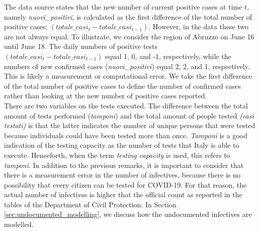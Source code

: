 \documentclass[12pt]{article}
\begin{document}
	The data source states that the new number of current positive cases at time $t$, namely \textit{nuovi\_positivi}, is calculated as the first difference of the total number of positive cases: $(totale\_casi_t - totale\_casi_{t-1})$. However, in the data these two are not always equal. To illustrate, we consider the region of Abruzzo on June 16 until June 18. The daily numbers of positive tests $(totale\_casi_t - totale\_casi_{t-1})$ equal 1, 0, and -1, respectively, while the numbers of new confirmed cases (\textit{nuovi\_positivi}) equal 2, 2, and 1, respectively. This is likely a measurement or computational error. We take the first difference of the total number of positive cases to define the number of confirmed cases rather than looking at the new number of positive cases reported.
	\\
	
	There are two variables on the tests executed. The difference between the total amount of tests performed (\textit{tamponi}) and the total amount of people tested \textit{(casi testati)} is that the latter indicates the number of unique persons that were tested because individuals could have been tested more than once. \textit{Tamponi} is a good indication of the testing capacity as the number of tests that Italy is able to execute. Henceforth, when the term \textit{testing capacity} is used, this refers to \textit{tamponi}. In addition to the previous remarks, it is important to consider that there is a measurement error in the number of infectives, because there is no possibility that every citizen can be tested for COVID-19. For that reason, the actual number of infectives is higher that the official count as reported in the tables of the Department of Civil Protection. In Section \ref{sec:undocumented_modelling}, we discuss how the undocumented infectives are modelled.
	\\
	
\end{document}
